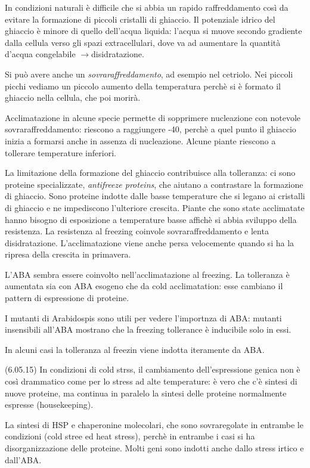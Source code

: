 \documentclass[a4paper,12pt]{book}
\newcommand{\lfreccia}{\ensuremath{\longrightarrow}}
\begin{document}
In condizioni naturali è difficile che si abbia un rapido raffreddamento così da evitare la formazione di piccoli cristalli di ghiaccio. Il potenziale idrico del ghiaccio è minore di quello dell'acqua liquida: l'acqua si muove secondo gradiente dalla cellula verso gli spazi extracellulari, dove va ad aumentare la quantità d'acqua congelabile \lfreccia disidratazione.

Si può avere anche un \emph{sovraraffreddamento}, ad esempio nel cetriolo. Nei piccoli picchi vediamo un piccolo aumento della temperatura perchè si è formato il ghiaccio nella cellula, che poi morirà.

Acclimatazione in alcune specie permette di
sopprimere nucleazione con notevole
sovraraffreddamento: riescono a raggiungere -40\textcelsius, perchè a quel punto il ghiaccio inizia a formarsi anche in assenza di nucleazione. Alcune piante riescono a tollerare temperature inferiori.

La limitazione della formazione del ghiaccio contribuisce alla tolleranza: ci sono proteine specializzate, \emph{antifreeze proteins}, che aiutano a contrastare la formazione di ghiaccio. Sono proteine indotte dalle basse temperature che si legano ai cristalli di ghiaccio e ne impediscono l'ulteriore crescita.
Piante che sono state acclimatate hanno bisogno di esposizione a temperature basse affichè si abbia sviluppo della resistenza. La resistenza al freezing coinvole sovraraffreddamento e lenta disidratazione. L'acclimatazione viene anche persa velocemente quando si ha la ripresa della crescita in primavera.

L'ABA sembra essere coinvolto nell'acclimatazione al freezing. La tolleranza è aumentata sia con ABA esogeno che da cold acclimatation: esse cambiano il pattern di espressione di proteine.

I mutanti di Arabidospis sono utili per vedere l'importnza di ABA: mutanti insensibili all'ABA mostrano che la freezing tollerance è inducibile solo in essi.

In alcuni casi la tolleranza al freezin viene indotta iteramente da ABA.

(6.05.15)
In condizioni di cold strss, il cambiamento dell'espressione genica non è così drammatico come per lo stress ad alte temperature: è vero che c'è sintesi di nuove proteine, ma continua in paralelo la sintesi delle proteine normalmente espresse (housekeeping).

La sintesi di HSP e chaperonine molecolari, che sono sovraregolate in entrambe le condizioni (cold stree ed heat stress), perchè in entrambe i casi si ha disorganizzazione delle proteine.
Molti geni sono indotti anche dallo stress irtico e dall'ABA.
 	
\end{document}
